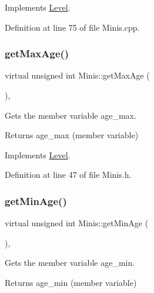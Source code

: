 Implements \hyperlink{class_level_ac118b390f16a75b9a0e9df198b3190ad}{Level}.



Definition at line 75 of file Minis.\+cpp.

\hypertarget{class_minis_a995e2db860e3a5c110cbead80ab61caa}{}\label{class_minis_a995e2db860e3a5c110cbead80ab61caa} 
\subsubsection{\texorpdfstring{get\+Max\+Age()}{getMaxAge()}}
{\footnotesize\ttfamily virtual unsigned int Minis\+::get\+Max\+Age (\begin{DoxyParamCaption}{ }\end{DoxyParamCaption})\hspace{0.3cm}{\ttfamily [inline]}, {\ttfamily [virtual]}}



Gets the member variable age\+\_\+max. 

\begin{DoxyReturn}{Returns}
age\+\_\+max (member variable) 
\end{DoxyReturn}


Implements \hyperlink{class_level_ae7b28ba0cb8d49372c4657fbe42706e1}{Level}.



Definition at line 47 of file Minis.\+h.

\hypertarget{class_minis_a062e99b463e0dd1e370b46e6fb37087a}{}\label{class_minis_a062e99b463e0dd1e370b46e6fb37087a} 
\subsubsection{\texorpdfstring{get\+Min\+Age()}{getMinAge()}}
{\footnotesize\ttfamily virtual unsigned int Minis\+::get\+Min\+Age (\begin{DoxyParamCaption}{ }\end{DoxyParamCaption})\hspace{0.3cm}{\ttfamily [inline]}, {\ttfamily [virtual]}}



Gets the member variable age\+\_\+min. 

\begin{DoxyReturn}{Returns}
age\+\_\+min (member variable) 
\end{DoxyReturn}


